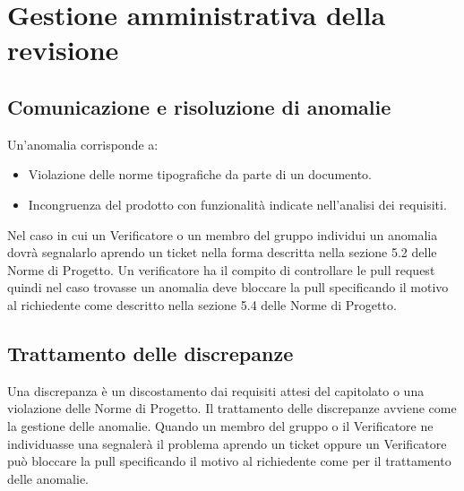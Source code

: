\section{Gestione amministrativa della revisione}
\subsection{Comunicazione e risoluzione di anomalie}
Un'anomalia corrisponde a:
\begin{itemize}
	\item Violazione delle norme tipografiche da parte di un documento.
	\item Incongruenza del prodotto con funzionalità indicate nell'analisi dei requisiti.
\end{itemize}
Nel caso in cui un Verificatore o un membro del gruppo individui un anomalia dovrà segnalarlo aprendo un ticket nella forma descritta nella sezione 5.2 delle Norme di Progetto. Un verificatore ha il compito di controllare le pull request quindi nel caso trovasse un anomalia deve bloccare la pull specificando il motivo al richiedente come descritto nella sezione 5.4 delle Norme di Progetto.
\subsection{Trattamento delle discrepanze}
Una discrepanza è un discostamento dai requisiti attesi del capitolato o una violazione delle Norme di Progetto.
Il trattamento delle discrepanze avviene come la gestione delle anomalie. Quando un membro del gruppo o il Verificatore ne individuasse una segnalerà il problema aprendo un ticket oppure un Verificatore può bloccare la pull specificando il motivo al richiedente come per il trattamento delle anomalie.

